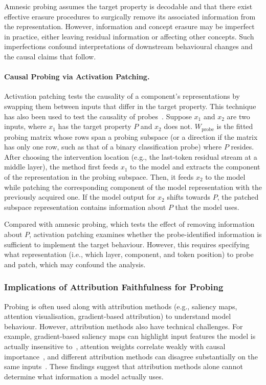 Amnesic probing assumes the target property is decodable and that there exist effective erasure procedures to surgically remove its associated information from the representation. However, information and concept erasure may be imperfect in practice, either leaving residual information or affecting other concepts. Such imperfections confound interpretations of downstream behavioural changes and the causal claims that follow.

\paragraph{Causal Probing via Activation Patching.}
Activation patching tests the causality of a component's representations by swapping
them between inputs that differ in the target property. This technique has also been used to test the causality of probes~. Suppose $x_1$ and $x_2$ are two inputs, where $x_1$ has the target property $P$ and $x_2$ does not. $W_{\text{probe}}$ is the fitted probing matrix whose rows span a probing subspace (or a direction if the matrix has only one row, such as that of a binary classification probe) where $P$ resides. After choosing the intervention location (e.g., the last-token residual stream at a middle layer), the method first feeds $x_1$ to the model and extracts the component of the representation in the probing subspace. Then, it feeds $x_2$ to the model while patching the corresponding component of the model representation with the previously acquired one. If the model output for $x_2$ shifts towards $P$, the patched subspace representation contains information about $P$ that the model uses.

Compared with amnesic probing, which tests the effect of removing information about $P$, activation patching examines whether the probe-identified information is sufficient to implement the target behaviour. However, this requires specifying what representation (i.e., which layer, component, and token position) to probe and patch, which may confound the analysis.

\subsubsection{Implications of Attribution Faithfulness for Probing}
Probing is often used along with attribution methods (e.g., saliency maps, attention visualisation, gradient-based attribution) to understand model behaviour. However, attribution methods also have technical challenges. For example, gradient-based saliency maps can highlight input features the model is actually insensitive to~, attention weights correlate weakly with causal importance~, and different attribution methods can disagree substantially on the same inputs~. These findings suggest that attribution methods alone cannot determine what information a model actually uses.


